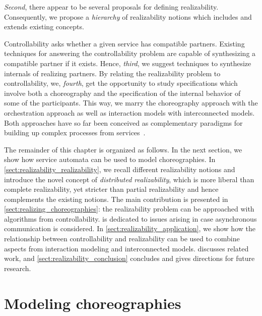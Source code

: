 \emph{Second}, there appear to be several proposals for defining realizability. Consequently, we propose a \emph{hierarchy} of realizability notions which includes and extends existing concepts.

Controllability asks whether a given service has compatible partners. Existing techniques for answering the controllability problem are capable of synthesizing a compatible partner if it exists. Hence, {\em third}, we suggest techniques to synthesize internals of realizing partners. By relating the realizability problem to controllability, we, {\em fourth}, get the opportunity to study specifications which involve both a choreography and the specification of the internal behavior of some of the participants. This way, we marry the choreography approach with the orchestration approach as well as interaction models with interconnected models. Both approaches have so far been conceived as complementary paradigms for building up complex processes from services~\cite{Peltz_2003_ieee,DijkmanD_2004_ijcis}.

\medskip

The remainder of this chapter is organized as follows. In the next section, we show how service automata can be used to model choreographies. In \autoref{sect:realizability_realizability}, we recall different realizability notions and introduce the novel concept of \emph{distributed realizability}, which is more liberal than complete realizability, yet stricter than partial realizability and hence complements the existing notions. The main contribution is presented in \autoref{sect:realizing_choreographies}: the realizability problem can be approached with algorithms from controllability.  is dedicated to issues arising in case asynchronous communication is considered. In \autoref{sect:realizability_application}, we show how the relationship between controllability and realizability can be used to combine aspects from interaction modeling and interconnected models.  discusses related work, and \autoref{sect:realizability_conclusion} concludes and gives directions for future research.





\section{Modeling choreographies}
\label{sect:realizability_framework}

